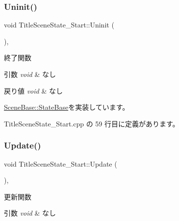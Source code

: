 \subsubsection{\texorpdfstring{Uninit()}{Uninit()}}
{\footnotesize\ttfamily void Title\+Scene\+State\+\_\+\+Start\+::\+Uninit (\begin{DoxyParamCaption}{ }\end{DoxyParamCaption})\hspace{0.3cm}{\ttfamily [override]}, {\ttfamily [virtual]}}



終了関数 


\begin{DoxyParams}{引数}
{\em void} & なし \\
\hline
\end{DoxyParams}

\begin{DoxyRetVals}{戻り値}
{\em void} & なし \\
\hline
\end{DoxyRetVals}


\mbox{\hyperlink{class_scene_base_1_1_state_base_a2763fa37e45b39bd8d3bbb735c76c59b}{Scene\+Base\+::\+State\+Base}}を実装しています。



 Title\+Scene\+State\+\_\+\+Start.\+cpp の 59 行目に定義があります。

\mbox{\label{class_title_scene_state___start_a2e98cf6810711b58766d7147168d02eb}} 
\subsubsection{\texorpdfstring{Update()}{Update()}}
{\footnotesize\ttfamily void Title\+Scene\+State\+\_\+\+Start\+::\+Update (\begin{DoxyParamCaption}{ }\end{DoxyParamCaption})\hspace{0.3cm}{\ttfamily [override]}, {\ttfamily [virtual]}}



更新関数 


\begin{DoxyParams}{引数}
{\em void} & なし \\
\hline
\end{DoxyParams}

